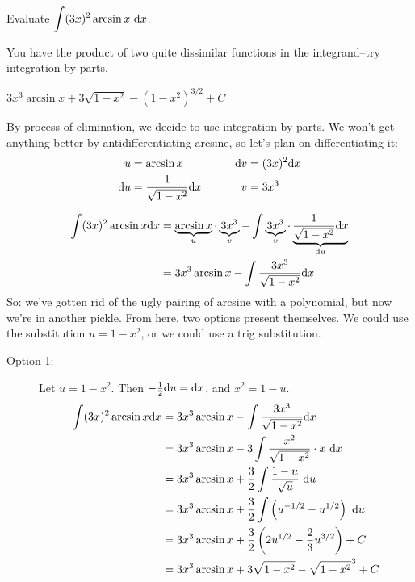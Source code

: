 \begin{question} Evaluate
$\displaystyle\int (3x)^2\arcsin x ~\mathrm{d}x$.
\end{question}

\begin{hint}
You have the product of two quite dissimilar functions in the integrand--try integration by parts.
\end{hint}

\begin{answer}
$3x^3\arcsin x + 3\sqrt{1-x^2}-(1-x^2)^{3/2} + C$
\end{answer}

\begin{solution}
By process of elimination, we decide to use  integration by parts. We won't get anything better by antidifferentiating arcsine, so let's plan on differentiating it:
\begin{alignat*}{2}
u&=\arcsin x~\qquad &\mathrm{d}v &= (3x)^2\mathrm{d}x\\
\mathrm{d}u&=\dfrac{1}{\sqrt{1-x^2}}\mathrm{d}x \qquad &v&=3x^3
\end{alignat*}

\begin{align*}
\int (3x)^2\arcsin x \mathrm{d}x&=
\underbrace{\arcsin x}_{u}\cdot\underbrace{3x^3}_{v}-\int
\underbrace{3x^3}_{v}\cdot
\underbrace{\frac{1}{\sqrt{1-x^2}}\mathrm{d}x}_{\mathrm{d}u}\\
&=3x^3\arcsin x -\int \frac{3x^3}{\sqrt{1-x^2}}\mathrm{d}x
\end{align*}
So: we've gotten rid of the ugly pairing of arcsine with a polynomial, but now we're in another pickle. From here, two options present themselves. We could use the substitution $u=1-x^2$, or we could use a trig substitution.

\begin{description}
\item[Option 1:] Let $u=1-x^2$. Then $-\frac{1}{2}\mathrm{d}u=\mathrm{d}x$, and $x^2 = 1-u$.
\begin{align*}
\int (3x)^2\arcsin x \mathrm{d}x&=
3x^3\arcsin x -\int \frac{3x^3}{\sqrt{1-x^2}}\mathrm{d}x\\
&=3x^3 \arcsin x - 3\int\frac{x^2}{\sqrt{1-x^2}}\cdot x~\mathrm{d}x
\\&=3x^3 \arcsin x + \frac{3}{2}\int\frac{1-u}{\sqrt{u}}~\mathrm{d}u
\\&=3x^3 \arcsin x + \frac{3}{2}\int\left(u^{-1/2} - u^{1/2}\right)~\mathrm{d}u
\\&=3x^3 \arcsin x + \frac{3}{2}\left(2u^{1/2} - \frac{2}{3}u^{3/2}\right)+C
\\&=3x^3 \arcsin x + 3\sqrt{1-x^2} - \sqrt{1-x^2}^3+C
\end{align*}



\end{description}
\end{solution}
